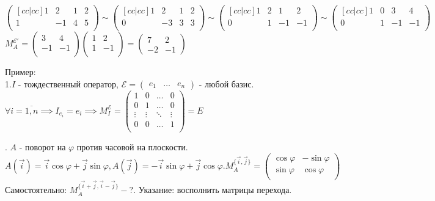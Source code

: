 \documentclass[../main.tex]{subfiles}
\begin{document}
$\begin{pmatrix}[cc|cc]
    1 & 2 & 1 & 2 \\
    1 & -1 & 4 & 5 \\
\end{pmatrix}\sim \begin{pmatrix}[cc|cc]
     1 & 2 & 1 & 2 \\
    0 & -3 & 3 & 3 \\
\end{pmatrix}\sim \begin{pmatrix}[cc|cc]
    1& 2 & 1 & 2 \\
    0 & 1 & -1 & -1 \\
\end{pmatrix}\sim \begin{pmatrix}[cc|cc]
    1 & 0 & 3 & 4 \\ 
    0 & 1 & -1 & -1 \\
\end{pmatrix}$ $M_{A}^{\mathcal{E'}}=\begin{pmatrix}
    3 & 4 \\
    -1 & -1 \\
\end{pmatrix}\begin{pmatrix}
    1 & 2 \\
    1 & -1 \\
\end{pmatrix}=\begin{pmatrix}
    7 & 2 \\ 
    -2 & -1 
\end{pmatrix}$


\newpage \noindent Пример:
\\1.$I$ - тождественный оператор, $\mathcal{E}= \begin{pmatrix}
    e_{1}& \dots & e_{n}
\end{pmatrix}$ - любой базис.\\ $\forall i=\overline{1,n}\implies I_{e_{i}}=e_{i}\implies M_{I}^{\mathcal{E}}=\begin{pmatrix}
    1 & 0 & \dots & 0 \\
    0 & 1 & \dots & 0 \\
    \vdots & \vdots & \ddots & \vdots \\
    0 & 0 & \dots & 1 \\
\end{pmatrix}= E $

. $A $ - поворот на $\varphi$ против часовой на плоскости. $A(\vec{i}) = \vec{i}\cos{\varphi}+\vec{j}\sin{\varphi}, A(\vec{j})= -\vec{i}\sin{\varphi}+\vec{j}\cos{\varphi}. M_{A}^{\{\vec{i},\vec{j}\}}= \begin{pmatrix}
    \cos{\varphi} & -\sin{\varphi} \\    
    \sin{\varphi} & \cos{\varphi} \\
\end{pmatrix}$ 
Самостоятельно: $M_{A}^{\{\vec{i}+\vec{j}, \vec{i}-\vec{j}\}}-?$. Указание: восполнить матрицы перехода.
\end{document}
